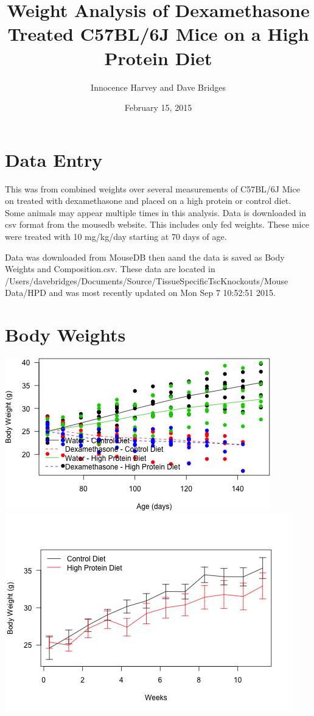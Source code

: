 \documentclass[]{article}
\title{Weight Analysis of Dexamethasone Treated C57BL/6J Mice on a High Protein
Diet}
\author{Innocence Harvey and Dave Bridges}
\date{February 15, 2015}
\begin{document}
\maketitle


\section{Data Entry}\label{data-entry}

This was from combined weights over several measurements of C57BL/6J
Mice on treated with dexamethasone and placed on a high protein or
control diet. Some animals may appear multiple times in this analysis.
Data is downloaded in csv format from the mousedb website. This includes
only fed weights. These mice were treated with 10 mg/kg/day starting at
70 days of age.

Data was downloaded from MouseDB then aand the data is saved as Body
Weights and Composition.csv. These data are located in
/Users/davebridges/Documents/Source/TissueSpecificTscKnockouts/Mouse
Data/HPD and was most recently updated on Mon Sep 7 10:52:51 2015.

\section{Body Weights}\label{body-weights}

\includegraphics{figures/weights-scatterplot-1.png}
\includegraphics{figures/weights-scatterplot-2.png}
\end{document}
